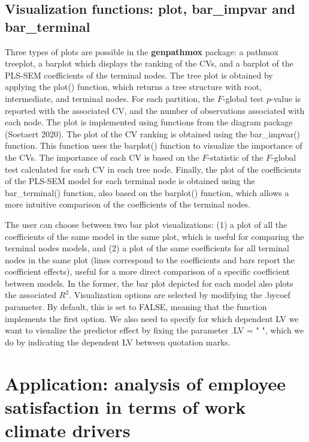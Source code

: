 \hypertarget{visualization-functions-plot-bar_impvar-and-bar_terminal}{%
\subsection{Visualization functions: plot, bar\_impvar and bar\_terminal}\label{visualization-functions-plot-bar_impvar-and-bar_terminal}}

Three types of plots are possible in the \textbf{genpathmox} package: a
pathmox treeplot, a barplot which displays the ranking of the CVs, and a
barplot of the PLS-SEM coefficients of the terminal nodes. The tree plot
is obtained by applying the plot() function, which returns a tree
structure with root, intermediate, and terminal nodes. For each
partition, the \(F\)-global test \(p\)-value is reported with the associated
CV, and the number of observations associated with each node. The plot
is implemented using functions from the diagram package (Soetaert 2020). The
plot of the CV ranking is obtained using the bar\_impvar() function. This
function uses the barplot() function to visualize the importance of the
CVs. The importance of each CV is based on the \(F\)-statistic of the
\(F\)-global test calculated for each CV in each tree node. Finally, the
plot of the coefficients of the PLS-SEM model for each terminal node is
obtained using the bar\_terminal() function, also based on the barplot()
function, which allows a more intuitive comparison of the coefficients
of the terminal nodes.

The user can choose between two bar plot visualizations: (1) a plot of
all the coefficients of the same model in the same plot, which is useful
for comparing the terminal nodes models, and (2) a plot of the same
coefficients for all terminal nodes in the same plot (lines correspond
to the coefficients and bars report the coefficient effects), useful for
a more direct comparison of a specific coefficient between models. In
the former, the bar plot depicted for each model also plots the
associated \(R^2\). Visualization options are selected by modifying the
.bycoef parameter. By default, this is set to FALSE, meaning that the
function implements the first option. We also need to specify for which
dependent LV we want to visualize the predictor effect by fixing the
parameter .LV = " ", which we do by indicating the dependent LV
between quotation marks.

\hypertarget{application-analysis-of-employee-satisfaction-in-terms-of-work-climate-drivers}{%
\section{Application: analysis of employee satisfaction in terms of work climate drivers}\label{application-analysis-of-employee-satisfaction-in-terms-of-work-climate-drivers}}

